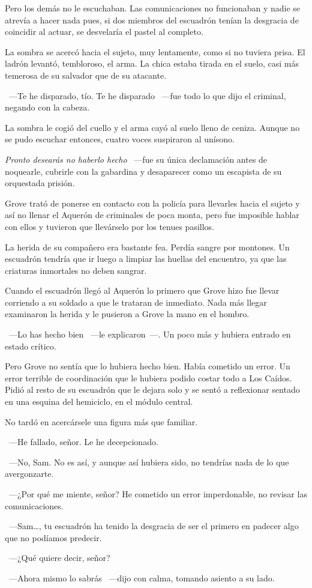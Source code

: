 Pero los demás no le escuchaban. Las comunicaciones no funcionaban y nadie se atrevía a hacer nada pues, si dos miembros del escuadrón tenían la desgracia de coincidir al actuar, se desvelaría el pastel al completo.

La sombra se acercó hacia el sujeto, muy lentamente, como si no tuviera prisa. El ladrón levantó, tembloroso, el arma. La chica estaba tirada en el suelo, casi más temerosa de su salvador que de su atacante.

~---Te he disparado, tío. Te he disparado ~---fue todo lo que dijo el criminal, negando con la cabeza.

La sombra le cogió del cuello y el arma cayó al suelo lleno de ceniza. Aunque no se pudo escuchar entonces, cuatro voces suspiraron al unísono.

\emph{Pronto desearás no haberlo hecho} ~---fue su única declamación antes de noquearle, cubrirle con la gabardina y desaparecer como un escapista de su orquestada prisión.

Grove trató de ponerse en contacto con la policía para llevarles hacia el sujeto y así no llenar el Aquerón de criminales de poca monta, pero fue imposible hablar con ellos y tuvieron que llevárselo por los tenues pasillos.

La herida de su compañero era bastante fea. Perdía sangre por montones. Un escuadrón tendría que ir luego a limpiar las huellas del encuentro, ya que las criaturas inmortales no deben sangrar.

Cuando el escuadrón llegó al Aquerón lo primero que Grove hizo fue llevar corriendo a su soldado a que le trataran de inmediato. Nada más llegar examinaron la herida y le pusieron a Grove la mano en el hombro.

~---Lo has hecho bien ~---le explicaron~---. Un poco más y hubiera entrado en estado crítico.

Pero Grove no sentía que lo hubiera hecho bien. Había cometido un error. Un error terrible de coordinación que le hubiera podido costar todo a Los Caídos. Pidió al resto de su escuadrón que le dejara solo y se sentó a reflexionar sentado en una esquina del hemiciclo, en el módulo central.

No tardó en acercársele una figura más que familiar.

~---He fallado, señor. Le he decepcionado.

~---No, Sam. No es así, y aunque así hubiera sido, no tendrías nada de lo que avergonzarte.

~---¿Por qué me miente, señor? He cometido un error imperdonable, no revisar las comunicaciones.

~---Sam\dots, tu escuadrón ha tenido la desgracia de ser el primero en padecer algo que no podíamos predecir.

~---¿Qué quiere decir, señor?

~---Ahora mismo lo sabrás ~---dijo con calma, tomando asiento a su lado.
